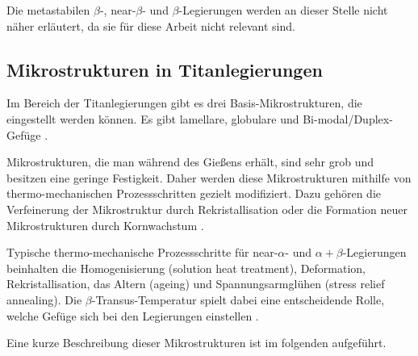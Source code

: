 Die metastabilen $\beta$-, near-$\beta$- und $\beta$-Legierungen werden an dieser Stelle nicht näher erläutert, da sie für diese Arbeit nicht relevant sind.

\subsection{Mikrostrukturen in Titanlegierungen}
Im Bereich der Titanlegierungen gibt es drei Basis-Mikrostrukturen, die eingestellt werden können. Es gibt lamellare, globulare und Bi-modal/Duplex-Gefüge \cite{C.Leyens.2005,Lutjering.2007,Boyer.2007,M.J.Donachie.2010}.

Mikrostrukturen, die man während des Gießens erhält, sind sehr grob und besitzen eine geringe Festigkeit. Daher werden diese Mikrostrukturen mithilfe von thermo-mechanischen Prozessschritten gezielt modifiziert. Dazu gehören die Verfeinerung der Mikrostruktur durch Rekristallisation oder die Formation neuer Mikrostrukturen durch Kornwachstum \cite{C.Leyens.2005,Lutjering.2007,Boyer.2007,M.J.Donachie.2010}.

Typische thermo-mechanische Prozessschritte für near-$\alpha$- und $\alpha+\beta$-Legierungen beinhalten die Homogenisierung (solution heat treatment), Deformation, Rekristallisation, das Altern (ageing) und Spannungsarmglühen (stress relief annealing). Die $\beta$-Transus-Temperatur spielt dabei eine entscheidende Rolle, welche Gefüge sich bei den Legierungen einstellen \cite{C.Leyens.2005,Lutjering.2007,Boyer.2007}.
 
Eine kurze Beschreibung dieser Mikrostrukturen ist im folgenden aufgeführt.


